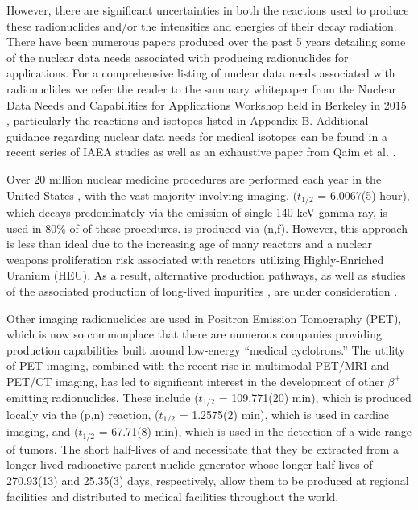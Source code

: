\documentclass[letterpaper]{ar-1col}
\begin{document}
However, there are significant uncertainties in both the reactions used to produce these radionuclides and/or the intensities and energies of their decay radiation.  There have been numerous papers produced over the past 5 years detailing some of the nuclear data needs associated with producing radionuclides for applications. For a comprehensive listing of nuclear data needs associated with radionuclides we refer the reader to the summary whitepaper from the Nuclear Data Needs and Capabilities for Applications Workshop held in Berkeley in 2015 \cite{bernstein2015nuclear}, particularly the reactions and isotopes listed in Appendix B.  Additional guidance regarding nuclear data needs for medical isotopes can be found in a recent series of IAEA studies \cite{Iae675,Iae596,Iae591} as well as an exhaustive paper from Qaim et al. \cite{Qaim201731}.

Over 20 million nuclear medicine procedures are performed each year in the United States \cite{Met09}, with the vast majority involving imaging.   ($t_{1/2}$ = 6.0067(5) hour), which decays predominately via the emission of single 140 keV gamma-ray, is used in 80\% of of these procedures.  is produced via (n,f).  However, this approach is less than ideal due to the increasing age of many reactors \cite{Qai12} and a nuclear weapons proliferation risk associated with reactors utilizing Highly-Enriched Uranium (HEU).  As a result, alternative  production pathways, as well as studies of the associated production of long-lived impurities \cite{Updegraff2013}, are under consideration \cite{Rut09}. 


Other imaging radionuclides are used in Positron Emission Tomography (PET), which is now so commonplace that
there are numerous companies   providing production capabilities built around low-energy \enquote{medical cyclotrons.} 
The utility of PET imaging, combined with the recent rise in multimodal PET/MRI and PET/CT imaging,  has
led to significant interest in the development of other $\beta^+$ emitting radionuclides.
These include  ($t_{1/2}$ = 109.771(20) min), which is produced locally via the (p,n) reaction,  ($t_{1/2}$ = 1.2575(2) min), which is used in cardiac imaging, and   ($t_{1/2}$ = 67.71(8) min), which is used in the detection of a wide range of tumors.  The short half-lives of  and  necessitate that they be extracted from a longer-lived radioactive parent nuclide generator whose longer half-lives of 270.93(13) and 25.35(3) days, respectively, allow them to be produced at regional facilities and distributed to medical facilities throughout the world.  
\end{document}

